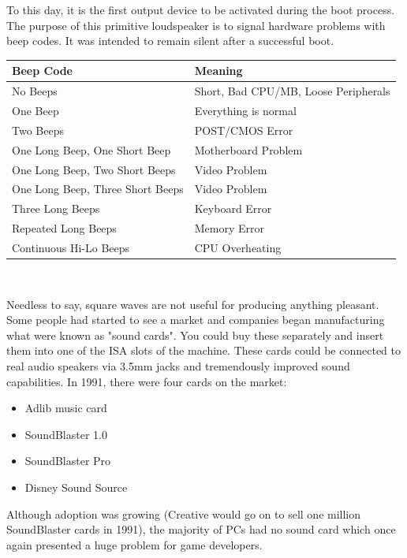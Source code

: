 \documentclass[book.tex]{subfiles}
\begin{document}
\par
 To this day, it is the first output device to be activated during the boot process. The purpose of this primitive loudspeaker is to signal hardware problems with beep codes. It was intended to remain silent after a successful boot.\\
\par
\begin{tabularx}{\textwidth}{l l}
\textbf{Beep Code} & \textbf{Meaning}  \\ \hline
No Beeps                         & Short, Bad CPU/MB, Loose Peripherals \\ \hline
One Beep                         & Everything is normal\\ \hline
Two Beeps                        & POST/CMOS Error \\ \hline 
One Long Beep, One Short Beep    & Motherboard Problem \\ \hline
One Long Beep, Two Short Beeps   & Video Problem \\ \hline
One Long Beep, Three Short Beeps & Video Problem \\ \hline
Three Long Beeps                 & Keyboard Error \\ \hline
Repeated Long Beeps              & Memory Error \\ \hline
Continuous Hi-Lo Beeps           & CPU Overheating \\ \hline
\end{tabularx}\\
\bigskip
\par
Needless to say, square waves are not useful for producing anything pleasant. Some people had started to see a market and companies began manufacturing what were known as "sound cards". You could buy these separately and insert them into one of the ISA slots of the machine. These cards could be connected to real audio speakers via 3.5mm jacks and tremendously improved sound capabilities. In 1991, there were four cards on the market:\\
\par
\begin{itemize}
\item Adlib music card
\item SoundBlaster 1.0
\item SoundBlaster Pro
\item Disney Sound Source
\end{itemize}
\par
Although adoption was growing (Creative would go on to sell one million SoundBlaster cards in 1991), the majority of PCs had no sound card which once again presented a huge problem for game developers.
\end{document}
